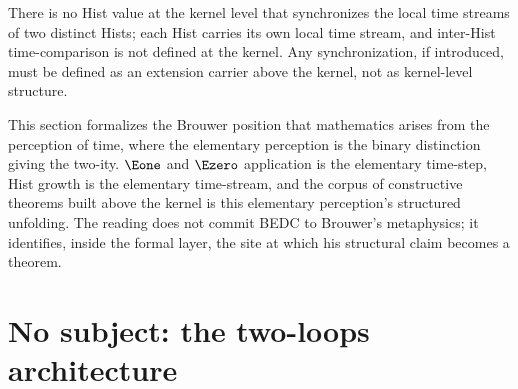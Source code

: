 \begin{corollary}
\label{cor:no-global-clock}
There is no Hist value at the kernel level that synchronizes the local time streams of two distinct Hists; each Hist carries its own local time stream, and inter-Hist time-comparison is not defined at the kernel. Any synchronization, if introduced, must be defined as an extension carrier above the kernel, not as kernel-level structure.
\end{corollary}
\begin{remark}[Reading]
\label{rem:brouwer-time}
This section formalizes the Brouwer position that mathematics arises from the perception of time, where the elementary perception is the binary distinction giving the two-ity. \(\Eone\) and \(\Ezero\) application is the elementary time-step, Hist growth is the elementary time-stream, and the corpus of constructive theorems built above the kernel is this elementary perception's structured unfolding. The reading does not commit BEDC to Brouwer's metaphysics; it identifies, inside the formal layer, the site at which his structural claim becomes a theorem.
\end{remark}

\section{No subject: the two-loops architecture}
\label{sec:observer-two-loops-no-subject}

